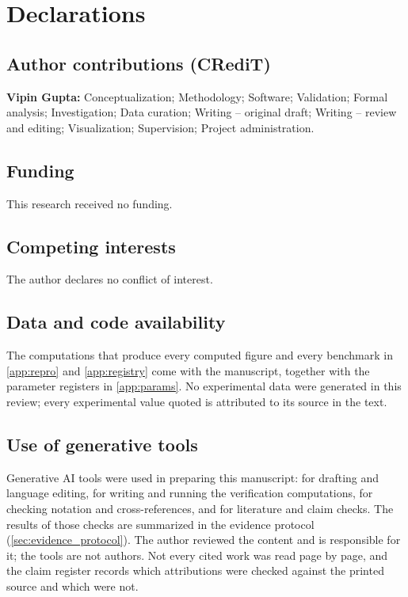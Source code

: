 \section*{Declarations}\label{sec:declarations}

\subsection*{Author contributions (CRediT)}
\textbf{Vipin Gupta:} Conceptualization; Methodology; Software; Validation; Formal analysis;
Investigation; Data curation; Writing -- original draft; Writing -- review and editing;
Visualization; Supervision; Project administration.

\subsection*{Funding}
This research received no funding.

\subsection*{Competing interests}
The author declares no conflict of interest.

\subsection*{Data and code availability}
The computations that produce every computed figure and every benchmark in \cref{app:repro} and
\cref{app:registry} come with the manuscript, together with the parameter registers in
\cref{app:params}. No experimental data were generated in this review; every experimental value quoted is
attributed to its source in the text.

\subsection*{Use of generative tools}
Generative AI tools were used in preparing this manuscript: for drafting and language editing, for writing and running the verification computations, for checking notation and cross-references, and for literature and claim checks. The results of those checks are summarized in the evidence protocol (\cref{sec:evidence_protocol}). The author reviewed the content and is responsible for it; the tools are not authors. Not every cited work was read page by page, and the claim register records which attributions were checked against the printed source and which were not.
